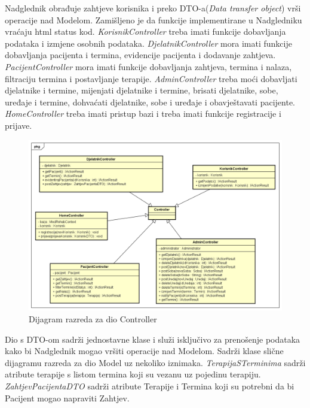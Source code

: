 			Nadglednik obrađuje zahtjeve korisnika i preko DTO-a(\textit{Data transfer object}) vrši operacije nad Modelom. Zamišljeno je da funkcije implementirane u Nadgledniku vraćaju html status kod. \textit{KorisnikController} treba imati funkcije dobavljanja podataka i izmjene osobnih podataka. \textit{DjelatnikController} mora imati funkcije dobavljanja pacijenta i termina, evidencije pacijenta i dodavanje zahtjeva. \textit{PacijentController} mora imati funkcije dobavljanja zahtjeva, termina i nalaza, filtraciju termina i postavljanje terapije. \textit{AdminController} treba moći dobavljati djelatnike i termine, mijenjati djelatnike i termine, brisati djelatnike, sobe, uređaje i termine, dohvaćati djelatnike, sobe i uređaje i obavještavati pacijente. \textit{HomeController} treba imati pristup bazi i treba imati funkcije registracije i prijave.
			
			\begin{figure}[H]
				\includegraphics[scale=0.4]{slike/Dijagram_razreda_3.PNG} %
				\centering
				\caption{Dijagram razreda za dio Controller}
				\label{fig:dijagram_razreda_1}
			\end{figure}
			
			Dio s DTO-om sadrži jednostavne klase i služi isključivo za prenošenje podataka kako bi Nadglednik mogao vršiti operacije nad Modelom. Sadrži klase slične dijagramu razreda za dio Model uz nekoliko iznimaka. \textit{TerapijaSTerminima} sadrži atribute terapije s listom termina koji su vezanu uz pojedinu terapiju. \textit{ZahtjevPacijentaDTO} sadrži atribute Terapije i Termina koji su potrebni da bi Pacijent mogao napraviti Zahtjev.
			
